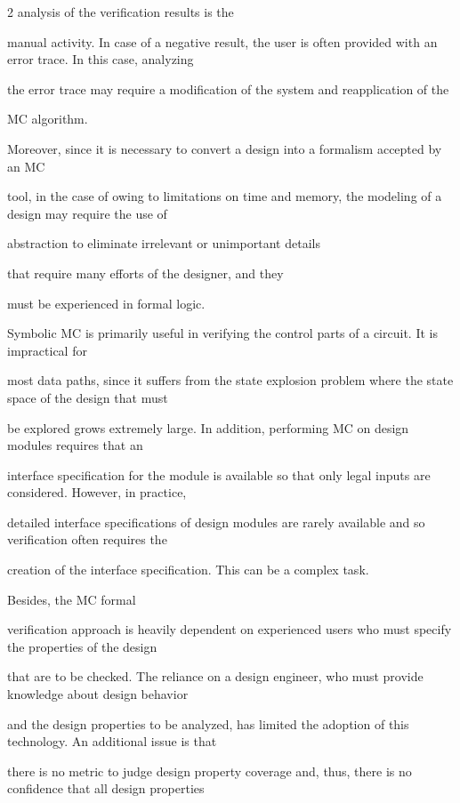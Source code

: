 \begin{multicols}{2}
analysis of the verification results is the


manual activity. In case of a negative result, the user is often provided with an error trace. In this case, analyzing


the error trace may require a modification of the system and reapplication of the


MC algorithm.








   Moreover, since it is necessary to convert a design into a formalism accepted by an MC


tool, in the case of owing to limitations on time and memory, the modeling of a design may require the use of


abstraction to eliminate irrelevant or unimportant details


that require many efforts of the designer, and they


must be experienced in formal logic.





    Symbolic MC is primarily useful in verifying the control parts of a circuit. It is impractical for


most data paths, since it suffers from the state explosion problem where the state space of the design that must


be explored grows extremely large. In addition, performing MC on design modules requires that an


interface specification for the module is available so that only legal inputs are considered. However, in practice,


detailed interface specifications of design modules are rarely available and so verification often requires the


creation of the interface specification. This can be a complex task.


Besides, the MC formal


verification approach is heavily dependent on experienced users who must specify the properties of the design


that are to be checked. The reliance on a design engineer, who must provide knowledge about design behavior


and the design properties to be analyzed, has limited the adoption of this technology. An additional issue is that


there is no metric to judge design property coverage and, thus, there is no confidence that all design properties



\end{multicols}

